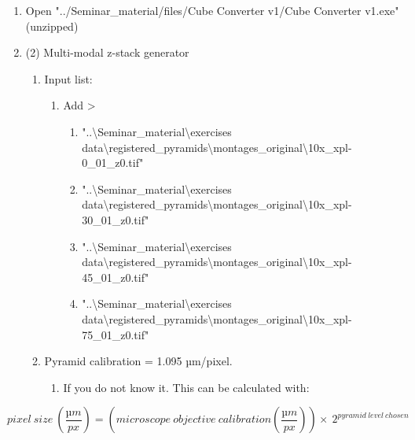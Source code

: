 	\begin{enumerate}
		\def\labelenumi{\arabic{enumi}.}
		\item
		Open "../Seminar\_material/files/Cube Converter v1/Cube Converter v1.exe" (unzipped)
		\item
		(2) Multi-modal z-stack generator
		
		\begin{enumerate}
			\def\labelenumii{\alph{enumii}.}
			\item
			Input list:
			
			\begin{enumerate}
				\def\labelenumiii{\roman{enumiii}.}
				\item
				Add \textgreater{}
				
				\begin{enumerate}
					\def\labelenumiv{\arabic{enumiv}.}
					\item
					"..\textbackslash Seminar\_material\textbackslash exercises data\textbackslash registered\_pyramids\textbackslash montages\_original\textbackslash10x\_xpl-0\_01\_z0.tif"
					\item
					"..\textbackslash Seminar\_material\textbackslash exercises data\textbackslash registered\_pyramids\textbackslash montages\_original\textbackslash10x\_xpl-30\_01\_z0.tif"
					\item
					"..\textbackslash Seminar\_material\textbackslash exercises data\textbackslash registered\_pyramids\textbackslash montages\_original\textbackslash10x\_xpl-45\_01\_z0.tif"
					\item
					"..\textbackslash Seminar\_material\textbackslash exercises data\textbackslash registered\_pyramids\textbackslash montages\_original\textbackslash10x\_xpl-75\_01\_z0.tif"
				\end{enumerate}
			\end{enumerate}
			\item
			Pyramid calibration = 1.095 µm/pixel.
			
			\begin{enumerate}
				\def\labelenumiii{\roman{enumiii}.}
				\item
				If you do not know it. This can be calculated with:
			\end{enumerate}
		\end{enumerate}
	\end{enumerate}
	
	\[pixel\ size\ \left( \frac{µm}{px} \right) = \left( microscope\ objective\ calibration\left( \frac{µm}{px} \right) \right) \times \ 2^{pyramid\ level\ chosen}\]
	
